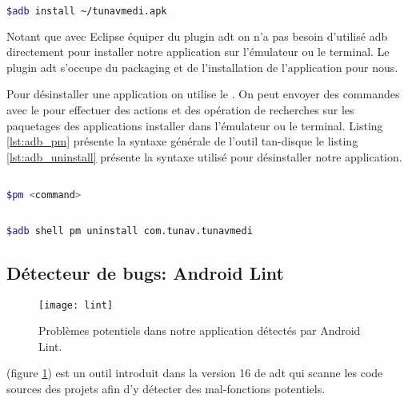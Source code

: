 \begin{lstlisting}[language=bash, label=lst:adb_install, caption=Exemple d'utilisation du commande adb install]

$adb install ~/tunavmedi.apk

\end{lstlisting}

Notant que avec Eclipse équiper du plugin \gls{adt} on n'a pas besoin d'utilisé
\gls{adb} directement pour installer notre application sur l'émulateur ou le
terminal. Le plugin \gls{adt} s'occupe du packaging et de l'installation de
l'application pour nous.


Pour désinstaller une application on utilise le . On peut
envoyer des commandes avec le  pour effectuer des actions et
des opération de recherches sur les paquetages des applications installer dans
l'émulateur ou le terminal. Listing \ref{lst:adb_pm} présente la syntaxe
générale de l'outil tan-disque le listing \ref{lst:adb_uninstall} présente la
syntaxe utilisé pour désinstaller notre application.


\begin{lstlisting}[language=bash, label=lst:adb_pm, caption=Syntaxe génerale de l'utilisation du Package Manager]

$pm <command>

\end{lstlisting}

\begin{lstlisting}[language=bash, label=lst:adb_uninstall, caption=Exemple de désinstallation]

$adb shell pm uninstall com.tunav.tunavmedi

\end{lstlisting}

\subsection{Détecteur de bugs: Android Lint}

\begin{figure}[H]
\center
\texttt{[image: lint]}
\caption{Problèmes potentiels dans notre application détectés par Android Lint.}
\label{fig:lint}
\end{figure}

\android{}  (figure \ref{fig:lint}) est un outil introduit dans la version 16 de \gls{adt} qui scanne les code sources des projets \android{} afin d'y détecter des mal-fonctions potentiels.

